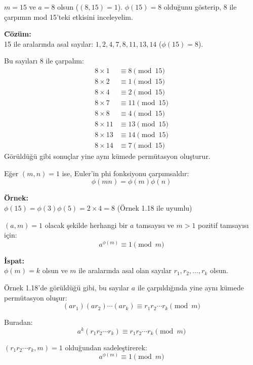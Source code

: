 \documentclass[12pt]{article}
\begin{document}
\begin{tcolorbox}[colback=red!5, colframe=red!50!black, title=\textbf{\"Ornek 1.18: Mod 15'te Euler Fonksiyonu}, fonttitle=\bfseries, sharp corners]
$m = 15$ ve $a = 8$ olsun ($(8,15)=1$). $\phi(15)=8$ olduğunu g\"osterip, 8 ile çarpımın mod 15'teki etkisini inceleyelim.

\textbf{\"C\"oz\"um:}\\
15 ile aralarında asal sayılar: $1,2,4,7,8,11,13,14$ ($\phi(15)=8$).

Bu sayıları 8 ile çarpalım:
\begin{align*}
8\times1 &\equiv8 \pmod{15} \\
8\times2 &\equiv1 \pmod{15} \\
8\times4 &\equiv2 \pmod{15} \\
8\times7 &\equiv11 \pmod{15} \\
8\times8 &\equiv4 \pmod{15} \\
8\times11 &\equiv13 \pmod{15} \\
8\times13 &\equiv14 \pmod{15} \\
8\times14 &\equiv7 \pmod{15}
\end{align*}
G\"or\"uld\"uğ\"u gibi sonuçlar yine aynı k\"umede perm\"utasyon oluşturur.
\end{tcolorbox}

\vspace{2em}

\begin{tcolorbox}[colback=green!5, colframe=green!50!black, title=\textbf{Sonuç 1.4: Euler Fonksiyonunun Çarpımsallığı}, fonttitle=\bfseries, sharp corners]
Eğer $(m,n)=1$ ise, Euler'in phi fonksiyonu çarpımsaldır:
\[
\phi(mn) = \phi(m)\phi(n)
\]

\textbf{\"Ornek:}\\
$\phi(15)=\phi(3)\phi(5)=2\times4=8$ (\"Ornek 1.18 ile uyumlu)
\end{tcolorbox}

\vspace{2em}

\begin{tcolorbox}[colback=purple!5, colframe=purple!50!black, title=\textbf{Teorem 1.13: Euler Teoremi}, fonttitle=\bfseries, sharp corners]
$(a,m)=1$ olacak şekilde herhangi bir $a$ tamsayısı ve $m>1$ pozitif tamsayısı için:
\[
a^{\phi(m)} \equiv 1 \pmod{m}
\]

\textbf{İspat:}\\
$\phi(m)=k$ olsun ve $m$ ile aralarında asal olan sayılar $r_1,r_2,...,r_k$ olsun.

\"Ornek 1.18'de g\"or\"uld\"uğ\"u gibi, bu sayılar $a$ ile çarpıldığında yine aynı k\"umede perm\"utasyon oluşur:
\[
(ar_1)(ar_2)\cdots(ar_k) \equiv r_1r_2\cdots r_k \pmod{m}
\]

Buradan:
\[
a^k(r_1r_2\cdots r_k) \equiv r_1r_2\cdots r_k \pmod{m}
\]

$(r_1r_2\cdots r_k,m)=1$ olduğundan sadeleştirerek:
\[
a^{\phi(m)} \equiv 1 \pmod{m}
\]
\end{tcolorbox}
\end{document}

